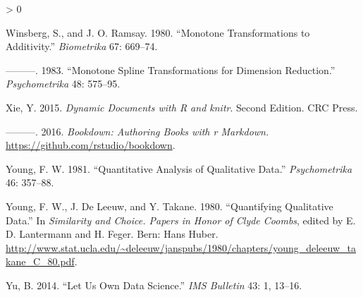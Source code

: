 \documentclass[
  12pt,
]{book}
\newlength{\cslhangindent}
\newenvironment{CSLReferences}[2] %
 {%
  \setlength{\parindent}{0pt}
  \ifodd #1 \everypar{\setlength{\hangindent}{\cslhangindent}}\ignorespaces\fi
  \ifnum #2 > 0
  \setlength{\parskip}{#2\baselineskip}
  \fi
 }%
 {}
\begin{document}
\begin{CSLReferences}{1}{0}
\leavevmode\hypertarget{ref-winsberg_ramsay_80}{}%
Winsberg, S., and J. O. Ramsay. 1980. {``{Monotone Transformations to Additivity}.''} \emph{Biometrika} 67: 669--74.

\leavevmode\hypertarget{ref-winsberg_ramsay_83}{}%
---------. 1983. {``{Monotone Spline Transformations for Dimension Reduction}.''} \emph{Psychometrika} 48: 575--95.

\leavevmode\hypertarget{ref-xie_15}{}%
Xie, Y. 2015. \emph{{Dynamic Documents with R and knitr}}. Second Edition. CRC Press.

\leavevmode\hypertarget{ref-xie_16}{}%
---------. 2016. \emph{Bookdown: Authoring Books with r Markdown.} \url{https://github.com/rstudio/bookdown}.

\leavevmode\hypertarget{ref-young_81}{}%
Young, F. W. 1981. {``{Quantitative Analysis of Qualitative Data}.''} \emph{Psychometrika} 46: 357--88.

\leavevmode\hypertarget{ref-young_deleeuw_takane_C_80}{}%
Young, F. W., J. De Leeuw, and Y. Takane. 1980. {``Quantifying Qualitative Data.''} In \emph{Similarity and Choice. Papers in Honor of Clyde Coombs}, edited by E. D. Lantermann and H. Feger. Bern: Hans Huber. \url{http://www.stat.ucla.edu/~deleeuw/janspubs/1980/chapters/young_deleeuw_takane_C_80.pdf}.

\leavevmode\hypertarget{ref-yu_14}{}%
Yu, B. 2014. {``{Let Us Own Data Science}.''} \emph{IMS Bulletin} 43: 1, 13--16.

\end{CSLReferences}
\end{document}
